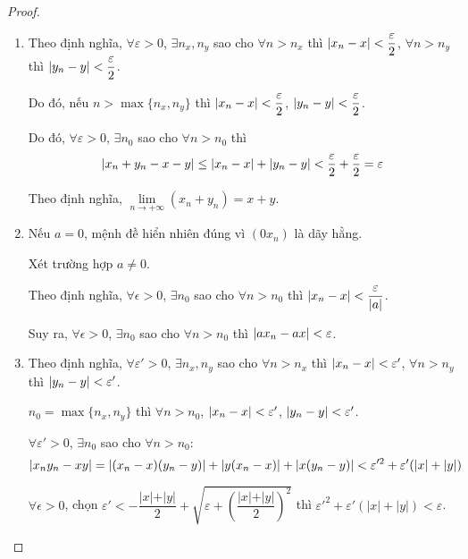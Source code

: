 \documentclass[class=analysis,crop=false]{standalone}
\begin{document}
\begin{proof}
    \begin{enumerate}[label = (\roman*)]
        \item Theo định nghĩa, $\forall\varepsilon > 0$, $\exists n_{x}, n_{y}$ sao cho $\forall n > n_{x}$ thì $\left\vert{x_{n} - x}\right\vert < \dfrac{\varepsilon}{2}$, $\forall n > n_{y}$ thì $\left\vert{y_{n} - y}\right\vert < \dfrac{\varepsilon}{2}$.
              \par Do đó, nếu $n > \max\{ n_{x}, n_{y} \}$ thì $\left\vert{x_{n} - x}\right\vert < \dfrac{\varepsilon}{2}$, $\left\vert{y_{n} - y}\right\vert < \dfrac{\varepsilon}{2}$.
              \par Do đó, $\forall\varepsilon > 0$, $\exists n_{0}$ sao cho $\forall n > n_{0}$ thì
              \[
                  \left\vert{x_{n} + y_{n} - x - y}\right\vert \le \left\vert{x_{n} - x}\right\vert + \left\vert{y_{n} - y}\right\vert < \frac{\varepsilon}{2} + \frac{\varepsilon}{2} = \varepsilon
              \]
              \par Theo định nghĩa, $\lim\limits_{n\to+\infty}(x_{n} + y_{n}) = x + y$.
        \item Nếu $a = 0$, mệnh đề hiển nhiên đúng vì $(0x_{n})$ là dãy hằng.
              \par Xét trường hợp $a\ne 0$.
              \par Theo định nghĩa, $\forall\epsilon > 0$, $\exists n_{0}$ sao cho $\forall n > n_{0}$ thì $\left\vert{x_{n} - x}\right\vert < \dfrac{\varepsilon}{\left\vert{a}\right\vert}$.
              \par Suy ra, $\forall\epsilon > 0$, $\exists n_{0}$ sao cho $\forall n > n_{0}$ thì $\left\vert{ax_{n} - ax}\right\vert < \varepsilon$.
        \item Theo định nghĩa, $\forall\varepsilon' > 0$, $\exists n_{x}, n_{y}$ sao cho $\forall n > n_{x}$ thì $\left\vert{x_{n} - x}\right\vert < \varepsilon'$, $\forall n > n_{y}$ thì $\left\vert{y_{n} - y}\right\vert < \varepsilon'$.
              \par $n_{0} = \max\{ n_{x}, n_{y} \}$ thì $\forall n > n_{0}$, $\left\vert{x_{n} - x}\right\vert < \varepsilon'$, $\left\vert{y_{n} - y}\right\vert < \varepsilon'$.
              \par $\forall\varepsilon' > 0$, $\exists n_{0}$ sao cho $\forall n > n_{0}$:
              \[
                  \left\vert{x_{n}y_{n} - xy}\right\vert = \left\vert{(x_{n} - x)(y_{n} - y)}\right\vert + \left\vert{y(x_{n} - x)}\right\vert + \left\vert{x(y_{n} - y)}\right\vert < \varepsilon'^{2} + \varepsilon'(\left\vert{x}\right\vert + \left\vert{y}\right\vert)
              \]
              \par $\forall\epsilon > 0$, chọn $\varepsilon' < -\dfrac{\vert x\vert + \vert y\vert}{2} + \sqrt{\varepsilon + \left(\dfrac{\vert x\vert + \vert y\vert}{2}\right)^{2}}$ thì $\varepsilon'^{2} + \varepsilon'(|x| + |y|) < \varepsilon$.

\end{enumerate}
\end{proof}
\end{document}
